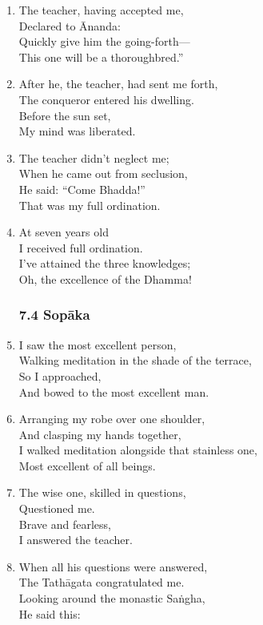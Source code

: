 \documentclass[10pt, openany]{book}
\newcommand*{\vleftofline}[1]{\leavevmode\llap{#1}}
\begin{document}
\begin{enumerate}
\item The teacher, having accepted me,\\
Declared to Ānanda:\\
\vleftofline{“}Quickly give him the going-forth—\\
This one will be a thoroughbred.”

\item After he, the teacher, had sent me forth,\\
The conqueror entered his dwelling.\\
Before the sun set,\\
My mind was liberated.

\item The teacher didn’t neglect me;\\
When he came out from seclusion,\\
He said: “Come Bhadda!”\\
That was my full ordination.

\item At seven years old\\
I received full ordination.\\
I’ve attained the three knowledges;\\
Oh, the excellence of the Dhamma!

\subsubsection*{7.4 Sopāka}

\item I saw the most excellent person,\\
Walking meditation in the shade of the terrace,\\
So I approached,\\
And bowed to the most excellent man.

\item Arranging my robe over one shoulder,\\
And clasping my hands together,\\
I walked meditation alongside that stainless one,\\
Most excellent of all beings.

\item The wise one, skilled in questions,\\
Questioned me.\\
Brave and fearless,\\
I answered the teacher.

\item When all his questions were answered,\\
The Tathāgata congratulated me.\\
Looking around the monastic Saṅgha,\\
He said this:


\end{enumerate}
\end{document}
